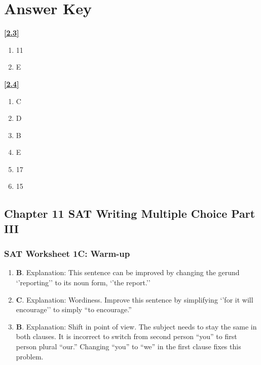\chapter{Answer Key}

\textbf{\ref{2.3}}

\begin{enumerate}[label=ex\arabic*)]
\item 11
\item E
\end{enumerate}

\textbf{\ref{2.4}}

\begin{enumerate}[label=\arabic*)]
\item C
\item D
\item B
\item E
\item 17
\item 15
\end{enumerate}



\section{Chapter 11 SAT Writing Multiple Choice Part III}



\subsection{SAT Worksheet 1C: Warm-up}

\begin{enumerate}
\item \textbf{B}. Explanation:  This sentence can be improved by changing the gerund `'reporting'' to its noun form, `'the report.''
\item \textbf{C}. Explanation:  Wordiness.  Improve this sentence by simplifying `'for it will encourage'' to simply ``to encourage.''
\item \textbf{B}. Explanation:  Shift in point of view.  The subject needs to stay the same in both clauses.  It is incorrect to switch from second person ``you'' to first person plural ``our.''  Changing ``you'' to ``we'' in the first clause fixes this problem.
\end{enumerate}




